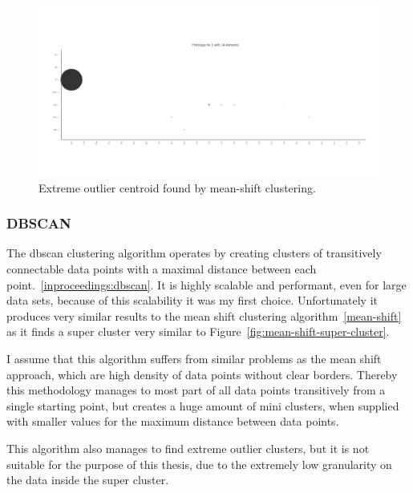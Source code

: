 \begin{figure}[H]
    \includegraphics[scale=0.32]{./graphs/analysis-mean-shift/outlier}
    \centering
    \caption{Extreme outlier centroid found by mean-shift clustering.}\label{fig:mean-shift-outlier}
\end{figure}

\subsubsection{DBSCAN}
The \ac{dbscan} clustering algorithm operates by creating clusters of transitively connectable data points with a maximal distance between each point.~\ref{inproceedings:dbscan}.
It is highly scalable and performant, even for large data sets, because of this scalability it was my first choice.
Unfortunately it produces very similar results to the mean shift clustering algorithm~\ref{mean-shift} as it finds a super cluster very similar to Figure~\ref{fig:mean-shift-super-cluster}.

I assume that this algorithm suffers from similar problems as the mean shift approach, which are high density of data points without clear borders.
Thereby this methodology manages to most part of all data points transitively from a single starting point, but creates a huge amount of mini clusters, when supplied with smaller values for the maximum distance between data points.

This algorithm also manages to find extreme outlier clusters, but it is not suitable for the purpose of this thesis, due to the extremely low granularity on the data inside the super cluster.


